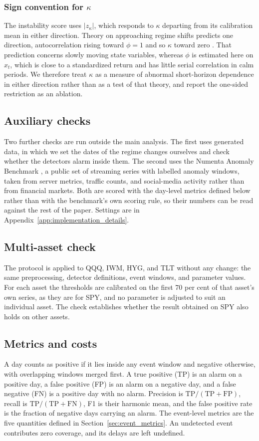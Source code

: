 \documentclass[pdflatex,sn-mathphys-num,iicol]{sn-jnl}
\begin{document}
\subsubsection*{Sign convention for $\kappa$}
The instability score uses $|z_\kappa|$, which responds to $\kappa$ departing from its calibration mean in either direction. Theory on approaching regime shifts predicts one direction, autocorrelation rising toward $\phi=1$ and so $\kappa$ toward zero \cite{scheffer2009,dakos2012}. That prediction concerns slowly moving state variables, whereas $\phi$ is estimated here on $x_t$, which is close to a standardized return and has little serial correlation in calm periods. We therefore treat $\kappa$ as a measure of abnormal short-horizon dependence in either direction rather than as a test of that theory, and report the one-sided restriction as an ablation.

\subsection{Auxiliary checks}
Two further checks are run outside the main analysis. The first uses generated data, in which we set the dates of the regime changes ourselves and check whether the detectors alarm inside them. The second uses the Numenta Anomaly Benchmark \cite{lavin2015}, a public set of streaming series with labelled anomaly windows, taken from server metrics, traffic counts, and social-media activity rather than from financial markets. Both are scored with the day-level metrics defined below rather than with the benchmark's own scoring rule, so their numbers can be read against the rest of the paper. Settings are in Appendix~\ref{app:implementation_details}.

\subsection{Multi-asset check}
The protocol is applied to QQQ, IWM, HYG, and TLT without any change: the same preprocessing, detector definitions, event windows, and parameter values. For each asset the thresholds are calibrated on the first 70 per cent of that asset's own series, as they are for SPY, and no parameter is adjusted to suit an individual asset. The check establishes whether the result obtained on SPY also holds on other assets.

\subsection{Metrics and costs}
A day counts as positive if it lies inside any event window and negative otherwise, with overlapping windows merged first. A true positive (TP) is an alarm on a positive day, a false positive (FP) is an alarm on a negative day, and a false negative (FN) is a positive day with no alarm. Precision is $\mathrm{TP}/(\mathrm{TP}+\mathrm{FP})$, recall is $\mathrm{TP}/(\mathrm{TP}+\mathrm{FN})$, F1 is their harmonic mean, and the false positive rate is the fraction of negative days carrying an alarm. The event-level metrics are the five quantities defined in Section~\ref{sec:event_metrics}. An undetected event contributes zero coverage, and its delays are left undefined.
\end{document}
